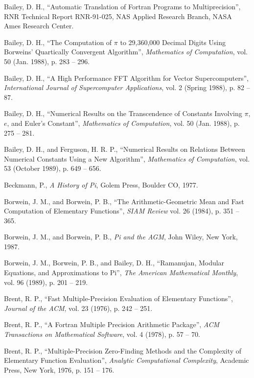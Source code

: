 \begin{thebibliography}{25}

 Bailey, D. H., ``Automatic Translation of Fortran
Programs to Multiprecision'', RNR Technical Report RNR-91-025, NAS
Applied Research Branch, NASA Ames Research Center.

 Bailey, D. H., ``The Computation of $\pi$ to 29,360,000
Decimal Digits Using Borweins' Quartically Convergent Algorithm'',
{\sl Mathematics of Computation}, vol. 50 (Jan. 1988), p. 283 -- 296.

 Bailey, D. H., ``A High Performance FFT Algorithm for
Vector Supercomputers'', {\sl International Journal of Supercomputer
Applications}, vol. 2 (Spring 1988), p. 82 -- 87.

 Bailey, D. H., ``Numerical Results on the Transcendence
of Constants Involving $\pi$, $e$, and Euler's Constant'', {\sl
Mathematics of Computation}, vol. 50 (Jan. 1988), p. 275 -- 281.

 Bailey, D. H., and Ferguson, H. R. P., ``Numerical
Results on Relations Between Numerical Constants Using a New
Algorithm'', {\sl Mathematics of Computation}, vol. 53 (October 1989),
p. 649 -- 656.

 Beckmann, P., {\sl A History of Pi}, Golem Press,
Boulder CO, 1977.

 Borwein, J. M., and Borwein, P. B., ``The
Arithmetic-Geometric Mean and Fast Computation of Elementary
Functions'', {\sl SIAM Review} vol. 26 (1984), p.  351 -- 365.

 Borwein, J. M., and Borwein, P. B., {\sl Pi and the
AGM}, John Wiley, New York, 1987.

 Borwein, J. M., Borwein, P. B., and Bailey, D. H.,
``Ramanujan, Modular Equations, and Approximations to Pi'', {\sl The
American Mathematical Monthly}, vol. 96 (1989), p. 201 -- 219.

 Brent, R. P., ``Fast Multiple-Precision Evaluation of
Elementary Functions'', {\sl Journal of the ACM}, vol. 23 (1976), p.
242 -- 251.

 Brent, R. P., ``A Fortran Multiple Precision
Arithmetic Package'', {\sl ACM Transactions on Mathematical Software},
vol. 4 (1978), p. 57 -- 70.

 Brent, R. P., ``Multiple-Precision Zero-Finding
Methods and the Complexity of Elementary Function Evaluation'', {\sl
Analytic Computational Complexity}, Academic Press, New York, 1976, p.
151 -- 176.


\end{thebibliography}
